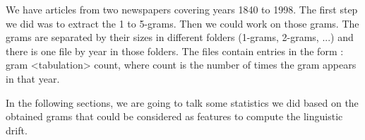 We have articles from two newspapers covering years 1840 to 1998. The first step we did was to extract the 1 to 5-grams. Then we could work on those grams. The grams are separated by their sizes in different folders (1-grams, 2-grams, ...) and there is one file by year in those folders. The files contain entries in the form : gram <tabulation> count, where count is the number of times the gram appears in that year.

In the following sections, we are going to talk some statistics we did based on the obtained grams that could be considered as features to compute the linguistic drift.
